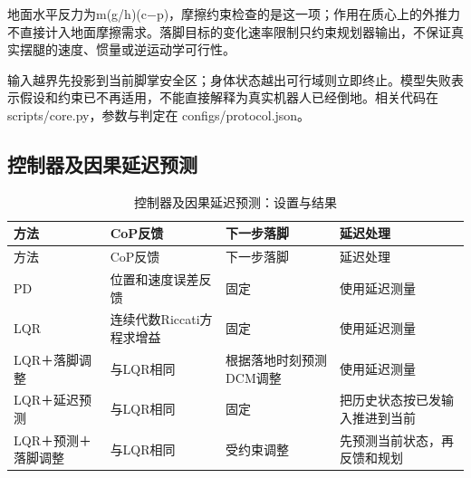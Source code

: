 地面水平反力为m(g/h)(c−p)，摩擦约束检查的是这一项；作用在质心上的外推力不直接计入地面摩擦需求。落脚目标的变化速率限制只约束规划器输出，不保证真实摆腿的速度、惯量或逆运动学可行性。

输入越界先投影到当前脚掌安全区；身体状态越出可行域则立即终止。模型失败表示假设和约束已不再适用，不能直接解释为真实机器人已经倒地。相关代码在 scripts/core.py，参数与判定在 configs/protocol.json。

\subsection{控制器及因果延迟预测}\label{s17-detail-3}

\FloatBarrier\begingroup\small\setlength{\tabcolsep}{2.5pt}
\begin{longtable}[]{@{}
  >{\raggedright\arraybackslash}p{}
  >{\raggedright\arraybackslash}p{}
  >{\raggedright\arraybackslash}p{}
  >{\raggedright\arraybackslash}p{}@{}}
\caption{控制器及因果延迟预测：设置与结果}\label{tab:s17-3}\tabularnewline
\toprule\noalign{}
\begin{minipage}[b]{\linewidth}\raggedright
方法
\end{minipage} & \begin{minipage}[b]{\linewidth}\raggedright
CoP反馈
\end{minipage} & \begin{minipage}[b]{\linewidth}\raggedright
下一步落脚
\end{minipage} & \begin{minipage}[b]{\linewidth}\raggedright
延迟处理
\end{minipage} \\
\midrule\noalign{}
\endfirsthead
\toprule\noalign{}
\begin{minipage}[b]{\linewidth}\raggedright
方法
\end{minipage} & \begin{minipage}[b]{\linewidth}\raggedright
CoP反馈
\end{minipage} & \begin{minipage}[b]{\linewidth}\raggedright
下一步落脚
\end{minipage} & \begin{minipage}[b]{\linewidth}\raggedright
延迟处理
\end{minipage} \\
\midrule\noalign{}
\endhead
\bottomrule\noalign{}
\endlastfoot
PD & 位置和速度误差反馈 & 固定 & 使用延迟测量 \\
LQR & 连续代数Riccati方程求增益 & 固定 & 使用延迟测量 \\
LQR＋落脚调整 & 与LQR相同 & 根据落地时刻预测DCM调整 & 使用延迟测量 \\
LQR＋延迟预测 & 与LQR相同 & 固定 & 把历史状态按已发输入推进到当前 \\
LQR＋预测＋落脚调整 & 与LQR相同 & 受约束调整 & 先预测当前状态，再反馈和规划 \\
\end{longtable}\endgroup

